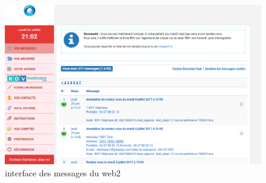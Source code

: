 \begin{figure}[!h]
    \centering
    \includegraphics[width=0.8\linewidth]{Images/web2messages}
    \caption{interface des messages du web2}
    \label{fig:archhexa}
\end{figure}

